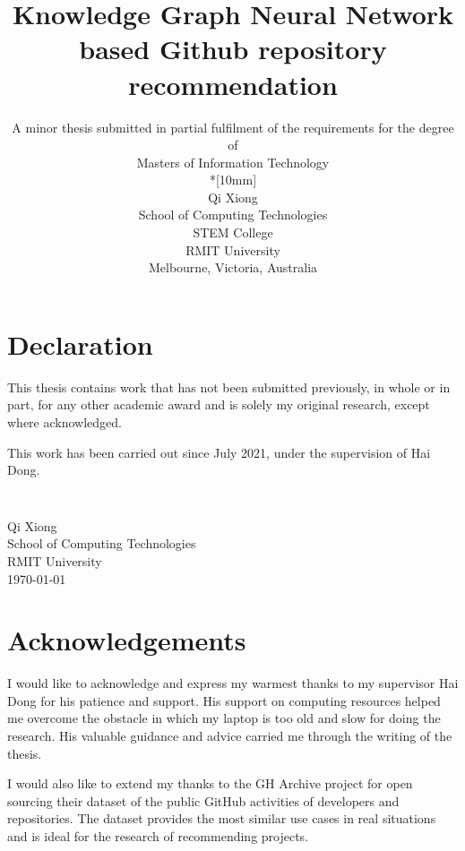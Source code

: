 \documentclass[11pt,twoside]{report}
\newcommand{\SubmissionDate}{\today}
\newcommand{\student}{Qi Xiong}
\newcommand{\supervisor}{Hai Dong}
\newcommand{\topic}{Knowledge Graph Neural Network based Github repository recommendation}
\newcommand{\school}{School of Computing Technologies}
\newcommand{\program}{Masters of Information Technology}
\newcommand{\institution}{RMIT University}
\begin{document}
\title{{\Large\bf \topic}}
\author{
A minor thesis submitted in partial fulfilment of the requirements for the degree of
\\\program\\*[10mm]
\\\student
\\\school
\\STEM College
\\\institution
\\Melbourne, Victoria, Australia
}
\maketitle
\thispagestyle{empty}

\chapter*{Declaration}

This thesis contains work that has not been submitted previously, in
whole or in part, for any other academic award and is solely my
original research, except where acknowledged.

This work has been carried out since July 2021, under the
supervision of {\supervisor}.

\paragraph{}
\vspace{5cm}\noindent \\\student \\
\school\\
\institution\\
\SubmissionDate


\chapter*{Acknowledgements}

I would like to acknowledge and express my warmest thanks to my supervisor Hai Dong for his patience and support. His support on computing resources helped me overcome the obstacle in which my laptop is too old and slow for doing the research. His valuable guidance and advice carried me through the writing of the thesis.

I would also like to extend my thanks to the GH Archive project for open sourcing their dataset of the public GitHub activities of developers and repositories. The dataset provides the most similar use cases in real situations and is ideal for the research of recommending projects.
\end{document}

